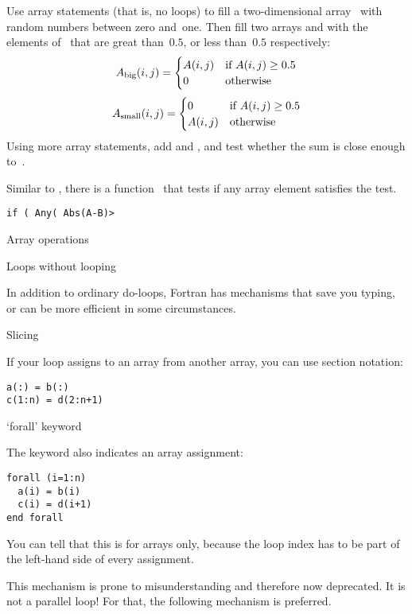 \begin{exercise}
  Use array statements (that is, no loops) to fill a two-dimensional
  array~ with random numbers between zero and~one. Then fill two
  arrays  and  with the elements of~ that are
  great than~$0.5$, or less than~$0.5$ respectively:
  \[ A_{\scriptstyle\mathrm{big}}(i,j) =
  \begin{cases}
    A(i,j)&\hbox{if $A(i,j)\geq 0.5$}\\ 0&\hbox{otherwise}
  \end{cases}
  \]
  \[ A_{\scriptstyle\mathrm{small}}(i,j) =
  \begin{cases}
    0&\hbox{if $A(i,j)\geq 0.5$}\\ A(i,j)&\hbox{otherwise}
  \end{cases}
  \]
  Using more array statements, add  and , and test
  whether the sum is close enough to~.
\end{exercise}

Similar to , there is a function~ that tests
if any array element satisfies the test.
\begin{lstlisting}
if ( Any( Abs(A-B)>
\end{lstlisting}

 {Array operations}

 {Loops without looping}

In addition to ordinary do-loops, Fortran has mechanisms that save you
typing, or can be more efficient in some circumstances.

 {Slicing}

If your loop assigns to an array from another array,
  you can use section notation:
\begin{lstlisting}
a(:) = b(:)
c(1:n) = d(2:n+1)
\end{lstlisting}

 {`forall' keyword}

The  keyword also indicates an array assignment:
\begin{lstlisting}
forall (i=1:n)
  a(i) = b(i)
  c(i) = d(i+1)
end forall
\end{lstlisting}
You can tell that this is for arrays only, because the loop index has
to be part of the left-hand side of every assignment.

This mechanism is prone to misunderstanding and therefore now
deprecated.
It is not a parallel loop! For that, the following mechanism is preferred.

